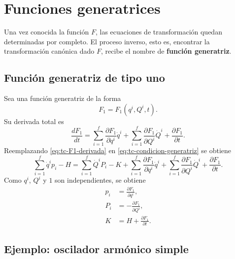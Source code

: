\documentclass[../apunte_mecanica_clasica.tex]{subfiles}
\begin{document}
\section{Funciones generatrices}
\label{sec:tc-funciones-generatrices}

Una vez conocida la función \(F\), las ecuaciones de transformación quedan determinadas por completo. El proceso inverso, esto es, encontrar la transformación canónica dado \(F\), recibe el nombre de \textbf{función generatriz}.

\subsection{Función generatriz de tipo uno}
\label{subsec:tc-f1}

Sea una función generatriz de la forma
\begin{equation}
    F_1=F_1(q^i,Q^i,t).
    \label{eq:tc-F1-def}
\end{equation}
Su derivada total es
\begin{equation}
    \frac{dF_1}{dt}
    =\sum_{i=1}^{f}\frac{\partial F_1}{\partial q^i}\dot q^i
    +\sum_{i=1}^{f}\frac{\partial F_1}{\partial Q^i}\dot Q^i
    +\frac{\partial F_1}{\partial t}.
    \label{eq:tc-F1-derivada}
\end{equation}
Reemplazando \eqref{eq:tc-F1-derivada} en \eqref{eq:tc-condicion-generatriz} se obtiene
\begin{equation}
    \sum_{i=1}^{f}\dot q^ip_i-H
    =
    \sum_{i=1}^{f}\dot Q^iP_i-K
    +\sum_{i=1}^{f}\frac{\partial F_1}{\partial q^i}\dot q^i
    +\sum_{i=1}^{f}\frac{\partial F_1}{\partial Q^i}\dot Q^i
    +\frac{\partial F_1}{\partial t}.
    \label{eq:tc-F1-comparacion}
\end{equation}
Como \(q^i\), \(Q^i\) y \(1\) son independientes, se obtiene
\begin{subequations}
\label{eq:tc-F1-ecuaciones}
\begin{align}
    p_i&=\frac{\partial F_1}{\partial q^i},
    \label{eq:tc-F1-p}\\
    P_i&=-\frac{\partial F_1}{\partial Q^i},
    \label{eq:tc-F1-P}\\
    K&=H+\frac{\partial F_1}{\partial t}.
    \label{eq:tc-F1-K}
\end{align}
\end{subequations}

\subsection{Ejemplo: oscilador armónico simple}
\label{subsec:tc-oscilador-F1}
\end{document}
